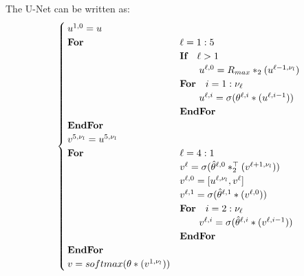 The U-Net can be written as:%
\begin{equation}\label{eq:unet}
\begin{cases}
u^{1,0}=u\\
\text{\bf For} &\ell = 1:5 \\
&\text{\bf If} \quad \ell > 1 \\
&\quad \quad u^{\ell,0}=R_{max}*_2(u^{\ell-1,\nu_l})\\
&\text{\bf For} \quad i = 1:\nu_\ell \\
&\quad \quad u^{\ell,i} = \sigma(\theta^{\ell,i}\ast (u^{\ell,i-1}))\\
&\text{\bf EndFor} \\
\text{\bf EndFor}\\

v^{5,\nu_l}=u^{5,\nu_l}\\

\text{\bf For} &\ell = 4:1 \\
&v^{\ell} = \sigma(\hat{\theta}^{\ell,0}\ast^{\top}_2(v^{\ell+1,\nu_l}))\\
&v^{\ell,0} = [u^{\ell,\nu_l},v^{\ell}]\\
&v^{\ell,1} = \sigma(\hat{\theta}^{\ell,1}\ast(v^{\ell,0}))\\
\quad &\text{\bf For} \quad i = 2:\nu_\ell \\
&\quad \quad v^{\ell,i} = \sigma(\hat{\theta}^{\ell,i}\ast (v^{\ell,i-1}))\\
\quad &\text{\bf EndFor} \\
\text{\bf EndFor}\\
v = softmax(\theta \ast (v^{1,\nu_l}))\\

\end{cases}
\end{equation}